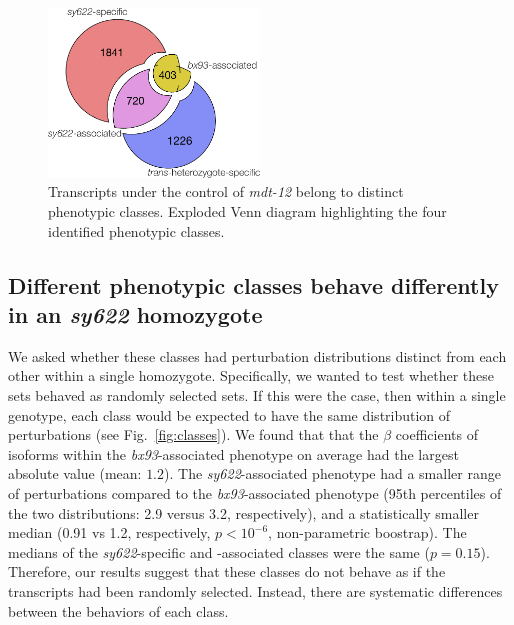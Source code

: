 \documentclass[10pt, twocolumn]{article}
\newcommand{\gene}[1]{\mbox{\emph{#1}}}
\newcommand{\dpy}{\gene{mdt-12}}
\begin{document}
\begin{figure}
  \includegraphics[width=0.5\textwidth]{../figs/exploded_venn.pdf}
  \caption{
  Transcripts under the control of \dpy{} belong to distinct phenotypic
  classes. Exploded Venn diagram highlighting the four identified phenotypic
  classes.
  }
\label{fig:venn}
\end{figure}

\subsection*{Different phenotypic classes behave differently in an
            \emph{sy622} homozygote}
We asked whether these classes had perturbation distributions distinct from each
other within a single homozygote. Specifically, we wanted to test whether these
sets behaved as randomly selected sets. If this were the case, then within a
single genotype, each class would be expected to have the same distribution of
perturbations (see Fig.~\ref{fig:classes}). We found that that the $\beta$
coefficients of isoforms within the \emph{bx93}-associated phenotype on average
had the largest absolute value (mean: $1.2$). The \emph{sy622}-associated
phenotype had a smaller range of perturbations compared to the
\emph{bx93}-associated phenotype (95th percentiles of the two distributions: 2.9
versus 3.2, respectively), and a statistically smaller median (0.91 vs 1.2,
respectively, $p < 10^{-6}$, non-parametric boostrap). The medians of the
\emph{sy622}-specific and -associated classes were the same ($p=0.15$).
Therefore, our results suggest that these classes do not behave as if the
transcripts had been randomly selected. Instead, there are systematic
differences between the behaviors of each class.
\end{document}
